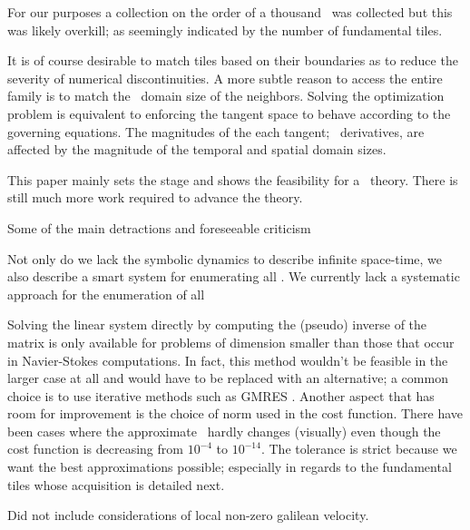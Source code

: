 \begin{description}
{%

For our purposes a collection on the order of a thousand \twots\
was collected but this was likely overkill; as seemingly indicated by the number
of fundamental tiles.

It is of course desirable to match tiles based on their boundaries as to reduce the severity of numerical
discontinuities. A more subtle reason to access the entire family is to match the
\spt\ domain size of the neighbors. Solving the optimization problem is equivalent
to enforcing the tangent space to behave according to the governing equations.
The magnitudes of the each tangent; \spt\ derivatives, are affected by the magnitude
of the temporal and spatial domain sizes.

This paper mainly sets the stage and shows the feasibility for a \spt\ theory. There
is still much more work required to advance the theory.

Some of the main detractions and foreseeable criticism



Not only do we lack the symbolic
dynamics to describe infinite space-time, we also describe a smart system for enumerating all
\twots.
We currently lack a systematic approach for the enumeration of all


\item[Criticisms of these methods]
Solving the linear system directly by computing the (pseudo) inverse
of the matrix
is only available for problems of dimension smaller than those that
occur in Navier-Stokes
computations. In fact, this method wouldn't be feasible in the larger
case at all and
would have to be replaced with an alternative; a common choice is to
use iterative
methods such as GMRES . Another aspect that has room for
improvement is
the choice of norm used in the cost function. There have been cases
where the
approximate \twot\ hardly changes (visually) even though the cost
 function is
decreasing from $10^{-4}$ to $10^{-14}$. The tolerance is strict
because we want
the best approximations possible; especially in regards to the
fundamental tiles
whose acquisition is detailed next.

Did not include considerations of local non-zero galilean velocity.

}
\end{description}
